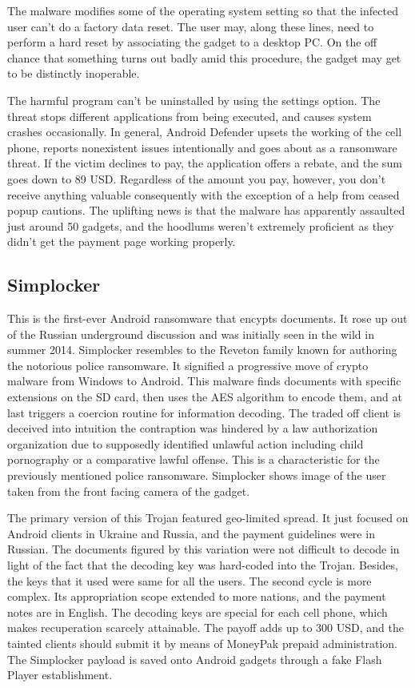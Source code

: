 The malware modifies some of the operating system setting so that the infected user can't do a factory data reset.
The user may, along these lines, need to perform a hard reset by associating the gadget to a desktop PC. 
On the off chance that something turns out badly amid this procedure, the gadget may get to be distinctly inoperable. 

The harmful program can't be uninstalled by using the settings option. 
The threat stops different applications from being executed, and causes system crashes occasionally. 
In general, Android Defender upsets the working of the cell phone, reports nonexistent issues intentionally and goes about as a ransomware threat. 
If the victim declines to pay, the application offers a rebate, and the sum goes down to 89 USD. 
Regardless of the amount you pay, however, you don't receive anything valuable consequently with the exception of a help from ceased popup cautions. 
The uplifting news is that the malware has apparently assaulted just around 50 gadgets, and the hoodlums weren't extremely proficient as they didn't get the payment page working properly.

\subsection{Simplocker}

This is the first-ever Android ransomware that encypts documents. 
It rose up out of the Russian underground discussion and was initially seen in the wild in summer 2014. 
Simplocker resembles to the Reveton family known for authoring the notorious police ransomware. 
It signified a progressive move of crypto malware from Windows to Android. 
This malware finds documents with specific extensions on the SD card, then uses the AES algorithm to encode them, and at last triggers a coercion routine for information decoding. 
The traded off client is deceived into intuition the contraption was hindered by a law authorization organization due to supposedly identified unlawful action including child pornography or a comparative lawful offense. 
This is a characteristic for the previously mentioned police ransomware. 
Simplocker shows image of the user taken from the front facing camera of the gadget. 

The primary version of this Trojan featured geo-limited spread. 
It just focused on Android clients in Ukraine and Russia, and the payment guidelines were in Russian. 
The documents figured by this variation were not difficult to decode in light of the fact that the decoding key was hard-coded into the Trojan. 
Besides, the keys that it used were same for all the users. 
The second cycle is more complex. Its appropriation scope extended to more nations, and the payment notes are in English. 
The decoding keys are special for each cell phone, which makes recuperation scarcely attainable. 
The payoff adds up to 300 USD, and the tainted clients should submit it by means of MoneyPak prepaid administration. 
The Simplocker payload is saved onto Android gadgets through a fake Flash Player establishment. 

